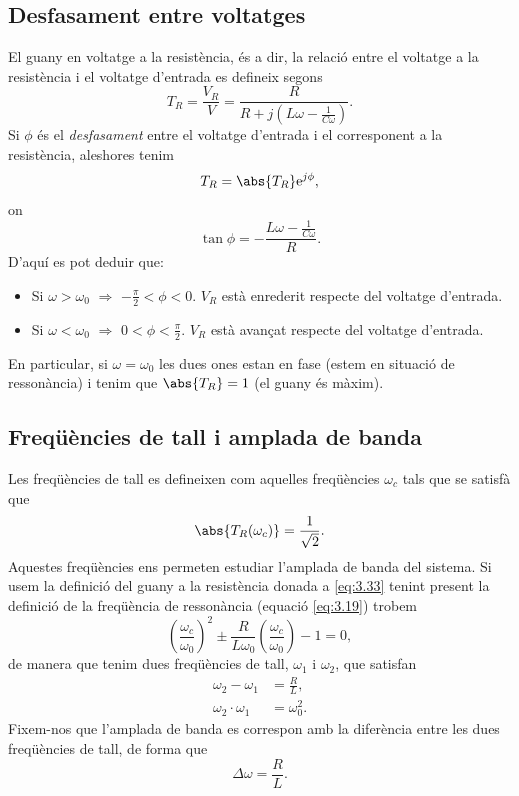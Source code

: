 \documentclass[a4paper,10.5pt]{report}
\begin{document}
\subsection{Desfasament entre voltatges}
El guany en voltatge a la resistència, és a dir, la relació entre el voltatge a la resistència i el voltatge d'entrada es defineix segons
\begin{equation}
	T_R = \frac{V_R}{V} = \frac{R}{R+j(L\omega - \frac{1}{C\omega})} \label{eq:3.33}.
\end{equation}
Si $\phi$ és el \textit{desfasament} entre el voltatge d'entrada i el corresponent a la resistència, aleshores tenim
\begin{equation}
	T_R = \abs{T_R}\mathrm{e}^{j \phi},
\end{equation}
on
\begin{equation}
	\tan \phi = -\frac{L\omega - \frac{1}{C\omega}}{R}.
\end{equation}
D'aquí es pot deduir que:
\begin{itemize}
	\item Si $\omega > \omega_0$ $\Rightarrow$ $-\frac{\pi}{2}<\phi<0$. $V_R$ està enrederit respecte del voltatge d'entrada.
 	\item Si $\omega < \omega_0$ $\Rightarrow$ $0<\phi<\frac{\pi}{2}$. $V_R$ està avançat respecte del voltatge d'entrada.
\end{itemize}
En particular, si $\omega = \omega_0$ les dues ones estan en fase (estem en situació de ressonància) i tenim que $\abs{T_R} = 1$ (el guany és màxim).

\subsection{Freqüències de tall i amplada de banda}
Les freqüències de tall es defineixen com aquelles freqüències $\omega_c$ tals que se satisfà que
\begin{equation}
	\abs{T_R(\omega_c)} = \frac{1}{\sqrt{2}}.
\end{equation}
Aquestes freqüències ens permeten estudiar l'amplada de banda del sistema. Si usem la definició del guany a la resistència donada a \eqref{eq:3.33} tenint present la definició de la freqüència de ressonància (equació \eqref{eq:3.19}) trobem
\begin{equation}
	\left(\frac{\omega_c}{\omega_0}\right)^2 \pm \frac{R}{L\omega_0}\left(\frac{\omega_c}{\omega_0}\right) -1=0,
\end{equation}
de manera que tenim dues freqüències de tall, $\omega_1$ i $\omega_2$, que satisfan 
\begin{align}
	\omega_2-\omega_1 & = \frac{R}{L}, \label{eq:3.38} \\
	\omega_2 \cdot \omega_1 & = \omega_0^2 \label{eq:3.39}.
\end{align}
Fixem-nos que l'amplada de banda es correspon amb la diferència entre les dues freqüències de tall, de forma que
\begin{equation}
	\Delta \omega = \frac{R}{L}.
\end{equation}
\end{document}
